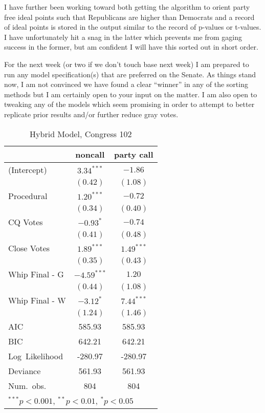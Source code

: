 \documentclass[12pt]{article}
\begin{document}
I have further been working toward both getting the algorithm to orient party free ideal points such that Republicans are higher than Democrats and a record of ideal points is stored in the output similar to the record of p-values or t-values. I have unfortunately hit a snag in the latter which prevents me from gaging success in the former, but am confident I will have this sorted out in short order.

For the next week (or two if we don't touch base next week) I am prepared to run any model specification(s) that are preferred on the Senate. As things stand now, I am not convinced we have found a clear ``winner'' in any of the sorting methods but I am certainly open to your input on the matter. I am also open to tweaking any of the models which seem promising in order to attempt to better replicate prior results and/or further reduce gray votes. 



\begin{table}[b]
	\begin{center}
		\begin{tabular}{l c c }
			\hline
			& noncall & party call \\
			\hline
			(Intercept)      & $3.34^{***}$  & $-1.86$      \\
			& $(0.42)$      & $(1.08)$     \\
			Procedural       & $1.20^{***}$  & $-0.72$      \\
			& $(0.34)$      & $(0.40)$     \\
			CQ Votes    & $-0.93^{*}$   & $-0.74$      \\
			& $(0.41)$      & $(0.48)$     \\
			Close Votes & $1.89^{***}$  & $1.49^{***}$ \\
			& $(0.35)$      & $(0.43)$     \\
			Whip Final - G     & $-4.59^{***}$ & $1.20$       \\
			& $(0.44)$      & $(1.08)$     \\
			Whip Final - W     & $-3.12^{*}$   & $7.44^{***}$ \\
			& $(1.24)$      & $(1.46)$     \\
			\hline
			AIC              & 585.93        & 585.93       \\
			BIC              & 642.21        & 642.21       \\
			Log\ Likelihood  & -280.97       & -280.97      \\
			Deviance         & 561.93        & 561.93       \\
			Num.\ obs.       & 804           & 804          \\
			\hline
			\multicolumn{3}{l}{\scriptsize{$^{***}p<0.001$, $^{**}p<0.01$, $^*p<0.05$}}
		\end{tabular}
		\caption{Hybrid Model, Congress 102}
	\end{center}
\end{table}
\end{document}
